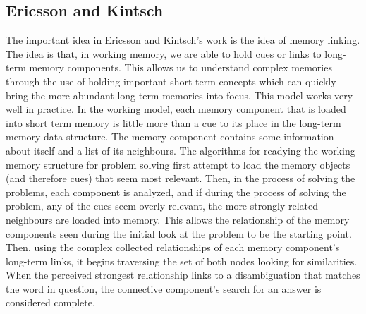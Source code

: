 \subsection{Ericsson and Kintsch}

The important idea in Ericsson and Kintsch's work is the idea of memory linking.
The idea is that, in working memory, we are able to hold cues or links to long-term 
memory components.  This allows us to understand complex memories through
the use of holding important short-term concepts which can quickly bring the
more abundant long-term memories into focus.  This model works very well in
practice.  In the working model, each memory component that is loaded into short
term memory is little more than a cue to its place in the long-term memory data
structure.  The memory component contains some information about itself and a
list of its neighbours.  The algorithms for readying the working-memory
structure for problem solving first attempt to load the memory objects (and
therefore cues) that seem most relevant.  Then, in the process of solving the
problems, each component is analyzed, and if during the process of solving the
problem, any of the cues seem overly relevant, the more strongly related
neighbours are loaded into memory.  This allows the relationship of the memory
components seen during the initial look at the problem to be the starting point.
Then, using the complex collected relationships of each memory component's long-term 
links, it begins traversing the set of both nodes looking for similarities.
When the perceived strongest relationship links to a disambiguation that matches
the word in question, the connective component's search for an answer is
considered complete.

